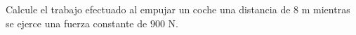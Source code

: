 \item Calcule el trabajo efectuado al empujar un coche una distancia de $8 \text{ m}$ mientras se ejerce una fuerza constante de $900 \text{ N}$.
